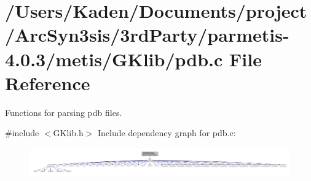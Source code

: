 \hypertarget{a00125}{}\section{/\+Users/\+Kaden/\+Documents/project/\+Arc\+Syn3sis/3rd\+Party/parmetis-\/4.0.3/metis/\+G\+Klib/pdb.c File Reference}
\label{a00125}


Functions for parsing pdb files.  


{\ttfamily \#include $<$G\+Klib.\+h$>$}\newline
Include dependency graph for pdb.\+c\+:\nopagebreak
\begin{figure}[H]
\begin{center}
\leavevmode
\includegraphics[width=350pt]{a00126}
\end{center}
\end{figure}
